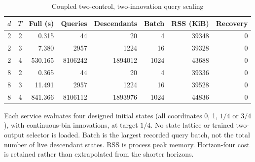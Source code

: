 \begin{table}[htbp]
\centering
\caption{Coupled two-control, two-innovation query scaling}\label{tab:vector67}
{\small\setlength{\tabcolsep}{4pt}
\begin{tabular}{rrrrrrrr}
\toprule
$d$ & $T$ & Full (s) & Queries & Descendants & Batch & RSS (KiB) & Recovery \\
\midrule
2 & 2 & 0.315 & 44 & 20 & 4 & 39348 & 0 \\
2 & 3 & 7.380 & 2957 & 1224 & 16 & 39328 & 0 \\
2 & 4 & 530.165 & 8106242 & 1894012 & 1024 & 43688 & 0 \\
8 & 2 & 0.365 & 44 & 20 & 4 & 39336 & 0 \\
8 & 3 & 11.491 & 2957 & 1224 & 16 & 39528 & 0 \\
8 & 4 & 841.366 & 8106112 & 1893976 & 1024 & 44836 & 0 \\
\bottomrule
\end{tabular}}
\par\smallskip
{\footnotesize Each service evaluates four designed initial states (all coordinates 0, 1, $1/4$ or $3/4$), with continuous-bin innovations, at target $1/4$. No state lattice or trained two-output selector is loaded. Batch is the largest recorded query batch, not the total number of live descendant states. RSS is process peak memory. Horizon-four cost is retained rather than extrapolated from the shorter horizons.}
\end{table}
